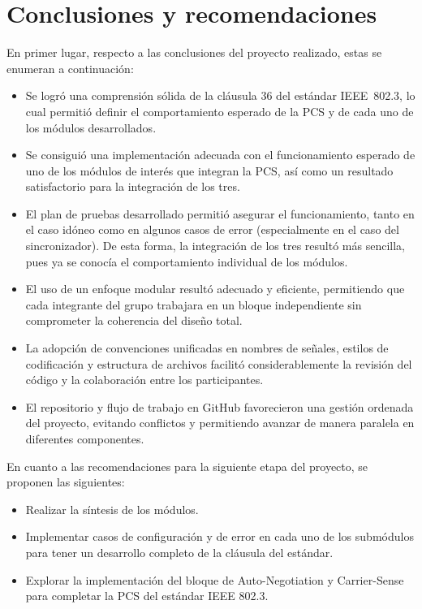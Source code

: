 \section{Conclusiones y recomendaciones}

En primer lugar, respecto a las conclusiones del proyecto realizado, estas se enumeran a continuación:

\begin{itemize}
    \item Se logró una comprensión sólida de la cláusula 36 del estándar IEEE~802.3, lo cual permitió definir el comportamiento esperado de la PCS y de cada uno de los módulos desarrollados.
    \item Se consiguió una implementación adecuada con el funcionamiento esperado de uno de los módulos de interés que integran la PCS, así como un resultado satisfactorio para la integración de los tres.
    \item El plan de pruebas desarrollado permitió asegurar el funcionamiento, tanto en el caso idóneo como en algunos casos de error (especialmente en el caso del sincronizador). De esta forma, la integración de los tres resultó más sencilla, pues ya se conocía el comportamiento individual de los módulos.
    \item El uso de un enfoque modular resultó adecuado y eficiente, permitiendo que cada integrante del grupo trabajara en un bloque independiente sin comprometer la coherencia del diseño total.
    \item La adopción de convenciones unificadas en nombres de señales, estilos de codificación y estructura de archivos facilitó considerablemente la revisión del código y la colaboración entre los participantes.
    \item El repositorio y flujo de trabajo en GitHub favorecieron una gestión ordenada del proyecto, evitando conflictos y permitiendo avanzar de manera paralela en diferentes componentes.
\end{itemize}

En cuanto a las recomendaciones para la siguiente etapa del proyecto, se proponen las siguientes:

\begin{itemize}
    \item Realizar la síntesis de los módulos.
    \item Implementar casos de configuración y de error en cada uno de los submódulos para tener un desarrollo completo de la cláusula del estándar.
    \item Explorar la implementación del bloque de Auto-Negotiation y Carrier-Sense para completar la PCS del estándar IEEE 802.3.
\end{itemize}
